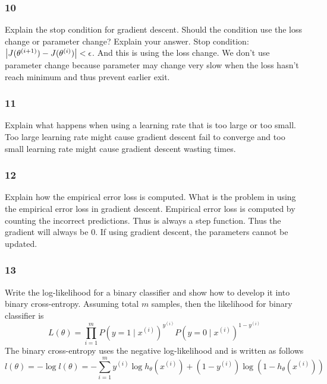 \documentclass{article}
\begin{document}
\subsubsection*{10}
\begin{myleftlinebox}
    Explain the stop condition for gradient descent. Should the condition use the loss change or parameter change? Explain your answer.
    \tcblower
    Stop condition: \(\left\vert J(\theta^{(i+1)})-J(\theta^{(i)})\right\vert<\epsilon\). And this is using the loss change. We don't use parameter change because parameter may change very slow when the loss hasn't reach minimum and thus prevent earlier exit.
\end{myleftlinebox}

\subsubsection*{11}
\begin{myleftlinebox}
    Explain what happens when using a learning rate that is too large or too small.
    \tcblower
    Too large learning rate might cause gradient descent fail to converge and too small learning rate might cause gradient descent wasting times.
\end{myleftlinebox}

\subsubsection*{12}
\begin{myleftlinebox}
    Explain how the empirical error loss is computed. What is the problem in using the empirical error loss in gradient descent.
    \tcblower
    Empirical error loss is computed by counting the incorrect predictions. Thus is always a step function. Thus the gradient will always be \(0\). If using gradient descent, the parameters cannot be updated.
\end{myleftlinebox}

\subsubsection*{13}
\begin{myleftlinebox}
    Write the log-likelihood for a binary classifier and show how to develop it into binary cross-entropy.
    \tcblower
    Assuming total \(m\) samples, then the likelihood for binary classifier is
    \[
        L(\theta)= \prod_{i=1}^m P(y=1\mid x^{(i)})^{y^{(i)}}P(y=0\mid x^{(i)})^{1-y^{(i)}}
    \]
    The binary cross-entropy uses the negative log-likelihood and is written as follows
    \[
        l(\theta)=-\log l(\theta)=-\sum_{i=1}^m y^{(i)}\log h_\theta(x^{(i)})+(1-y^{(i)})\log (1-h_\theta(x^{(i)}))
    \]
\end{myleftlinebox}
\end{document}
